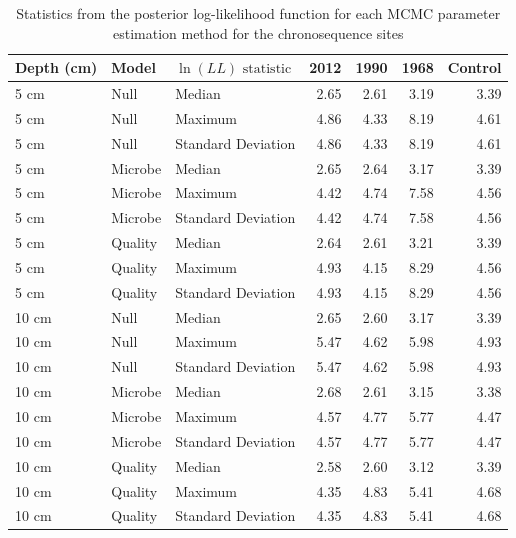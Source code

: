 \begin{table}

\caption{\label{tab:ll_stats}Statistics from the posterior log-likelihood function for each MCMC parameter estimation method for the chronosequence sites}
\centering
\begin{tabular}[t]{l|l|l|rrrr}
\hline
Depth (cm) & Model & $\ln(LL)\text{ statistic}$ & 2012 & 1990 & 1968 & Control\\
\hline
5 cm & Null & Median & 2.65 & 2.61 & 3.19 & 3.39\\
5 cm & Null & Maximum & 4.86 & 4.33 & 8.19 & 4.61\\
5 cm & Null & Standard Deviation & 4.86 & 4.33 & 8.19 & 4.61\\
5 cm & Microbe & Median & 2.65 & 2.64 & 3.17 & 3.39\\
5 cm & Microbe & Maximum & 4.42 & 4.74 & 7.58 & 4.56\\
5 cm & Microbe & Standard Deviation & 4.42 & 4.74 & 7.58 & 4.56\\
5 cm & Quality & Median & 2.64 & 2.61 & 3.21 & 3.39\\
5 cm & Quality & Maximum & 4.93 & 4.15 & 8.29 & 4.56\\
5 cm & Quality & Standard Deviation & 4.93 & 4.15 & 8.29 & 4.56\\ \hline
10 cm & Null & Median & 2.65 & 2.60 & 3.17 & 3.39\\
10 cm & Null & Maximum & 5.47 & 4.62 & 5.98 & 4.93\\
10 cm & Null & Standard Deviation & 5.47 & 4.62 & 5.98 & 4.93\\
10 cm & Microbe & Median & 2.68 & 2.61 & 3.15 & 3.38\\
10 cm & Microbe & Maximum & 4.57 & 4.77 & 5.77 & 4.47\\
10 cm & Microbe & Standard Deviation & 4.57 & 4.77 & 5.77 & 4.47\\
10 cm & Quality & Median & 2.58 & 2.60 & 3.12 & 3.39\\
10 cm & Quality & Maximum & 4.35 & 4.83 & 5.41 & 4.68\\
10 cm & Quality & Standard Deviation & 4.35 & 4.83 & 5.41 & 4.68\\
\hline
\end{tabular}
\end{table}
